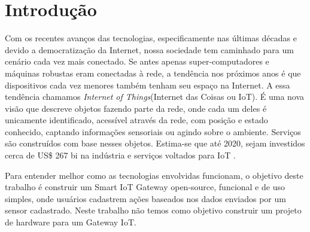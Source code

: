 \section*{Introdução}
\label{sec:intro}

Com os recentes avanços das tecnologias, especificamente nas últimas décadas e devido a democratização da Internet, nossa sociedade tem caminhado para um cenário cada vez mais conectado. Se antes apenas super-computadores e máquinas robustas eram conectadas à rede, a tendência nos próximos anos é que dispositivos cada vez menores também tenham seu espaço na Internet.
A essa tendência chamamos \textit{Internet of Things}(Internet das Coisas ou IoT). É uma nova visão que descreve objetos fazendo parte da rede, onde cada um deles é unicamente identificado, acessível através da rede, com posição e estado conhecido, captando informações sensoriais ou agindo sobre o ambiente. Serviços são construídos com base nesses objetos. Estima-se que até 2020, sejam investidos cerca de US\$ 267 bi na indústria e serviços voltados para IoT \cite{BCGPerspectives,Forbes}.

Para entender melhor como as tecnologias envolvidas funcionam, o objetivo deste trabalho é construir um Smart IoT Gateway open-source, funcional e de uso simples, onde usuários cadastrem ações baseados nos dados enviados por um sensor cadastrado. Neste trabalho não temos como objetivo construir um projeto de hardware para um Gateway IoT.
